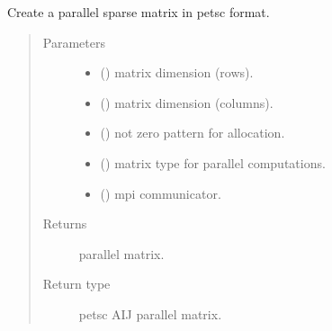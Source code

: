 \documentclass[letterpaper,10pt,english]{sphinxmanual}
\begin{document}

\begin{fulllineitems}
\label{\detokenize{petgem/parallel:petgem.parallel.createParallelMatrix}}
Create a parallel sparse matrix in petsc format.
\begin{quote}\begin{description}
\item[{Parameters}] \leavevmode\begin{itemize}
\item {} 
 () \textendash{} matrix dimension (rows).

\item {} 
 () \textendash{} matrix dimension (columns).

\item {} 
 () \textendash{} not zero pattern for allocation.

\item {} 
 () \textendash{} matrix type for parallel computations.

\item {} 
 () \textendash{} mpi communicator.

\end{itemize}

\item[{Returns}] \leavevmode
parallel matrix.

\item[{Return type}] \leavevmode
petsc AIJ parallel matrix.

\end{description}\end{quote}

\end{fulllineitems}
\end{document}
